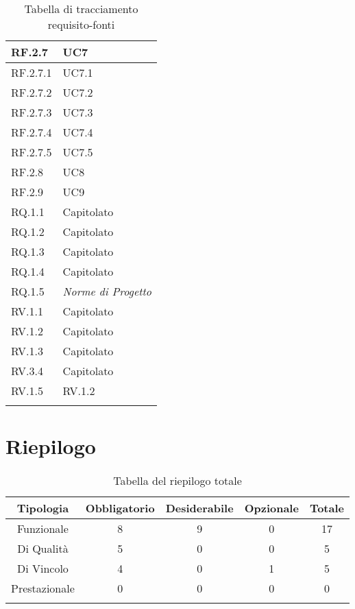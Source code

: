 \begin{center}
\begin{longtable}{|C{6cm}|C{6cm}|}
    RF.2.7 & UC7 \\ \hline
    RF.2.7.1 & UC7.1 \\ \hline
    RF.2.7.2 & UC7.2 \\ \hline
    RF.2.7.3 & UC7.3 \\ \hline
    RF.2.7.4 & UC7.4 \\ \hline
    RF.2.7.5 & UC7.5 \\ \hline
    RF.2.8 & UC8 \\ \hline
    RF.2.9 & UC9 \\ \hline
    RQ.1.1 & Capitolato \\ \hline
    RQ.1.2 & Capitolato \\ \hline
    RQ.1.3 & Capitolato \\ \hline
    RQ.1.4 & Capitolato \\ \hline
    RQ.1.5 & \textit{Norme di Progetto} \\ \hline
    RV.1.1 & Capitolato \\ \hline
    RV.1.2 & Capitolato \\ \hline
    RV.1.3 & Capitolato \\ \hline
    RV.3.4 & Capitolato \\ \hline
    RV.1.5 & RV.1.2 \\ \hline

    \caption{Tabella di tracciamento requisito-fonti}
  \end{longtable}
\end{center}


\section{Riepilogo}

\begin{center}
  \centering
  \begin{longtable}{|c|c|c|c|c|}
    \hline
    \rowcolor[HTML]{036400}
    {\color[HTML]{FFFFFF} \textbf{Tipologia}} & {\color[HTML]{FFFFFF} \textbf{Obbligatorio}} & {\color[HTML]{FFFFFF} \textbf{Desiderabile}} & {\color[HTML]{FFFFFF} \textbf{Opzionale}}  & {\color[HTML]{FFFFFF} \textbf{Totale}} \\ \hline
    \rowcolor[HTML]{EFEFEF}
    Funzionale & 8 & 9 & 0 & 17 \\ \hline
    \rowcolor[HTML]{C0C0C0}
    Di Qualità & 5 & 0 & 0 & 5 \\ \hline
    \rowcolor[HTML]{EFEFEF}
    Di Vincolo & 4 & 0 & 1 & 5 \\ \hline
    \rowcolor[HTML]{C0C0C0}
    Prestazionale & 0 & 0 & 0 & 0 \\ \hline

    \caption{Tabella del riepilogo totale}
  \end{longtable}
\end{center}
